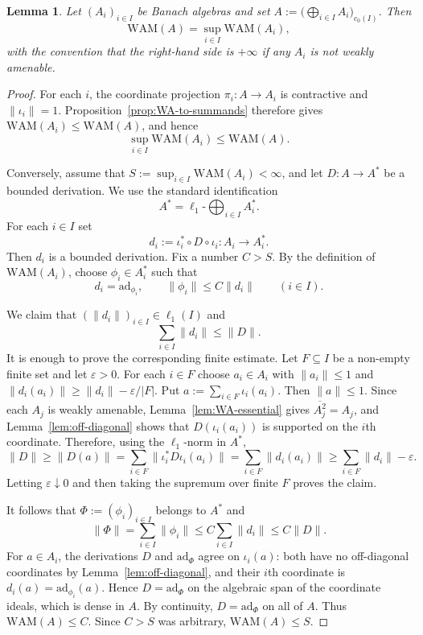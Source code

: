 \documentclass[reqno]{amsart}
\theoremstyle{plain}
\newtheorem{lemma}[theorem]{Lemma}
\theoremstyle{definition}
\theoremstyle{remark}
\renewcommand{\le}{\leqslant}
\renewcommand{\ge}{\geqslant}
\newcommand{\ad}{\mathrm{ad}}
\newcommand{\WAM}{\mathrm{WAM}}  %
\begin{document}
\begin{lemma}\label{lem:WAM-c0}
Let $(A_i)_{i\in I}$ be Banach algebras and set $A:=\big(\bigoplus_{i\in I}A_i\big)_{c_0(I)}$.
Then
\[
\WAM(A)=\sup_{i\in I}\WAM(A_i),
\]
with the convention that the right-hand side is $+\infty$ if any $A_i$ is not weakly amenable.
\end{lemma}


\begin{proof}
For each $i$, the coordinate projection $\pi_i\colon A\to A_i$ is contractive and
$\|\iota_i\|=1$.  Proposition~\ref{prop:WA-to-summands} therefore gives
$\WAM(A_i)\le \WAM(A)$, and hence
\[
\sup_{i\in I}\WAM(A_i)\le \WAM(A).
\]

Conversely, assume that $S:=\sup_{i\in I}\WAM(A_i)<\infty$, and let
$D\colon A\to A^*$ be a bounded derivation.  We use the standard identification
\[
A^*=\ell_1\text{-}\bigoplus_{i\in I} A_i^* .
\]
For each $i\in I$ set
\[
d_i:=\iota_i^*\circ D\circ \iota_i\colon A_i\to A_i^* .
\]
Then $d_i$ is a bounded derivation.  Fix a number $C>S$.  By the definition of
$\WAM(A_i)$, choose $\phi_i\in A_i^*$ such that
\[
d_i=\ad_{\phi_i},\qquad \|\phi_i\|\le C\|d_i\|\qquad (i\in I).
\]

We claim that $(\|d_i\|)_{i\in I}\in\ell_1(I)$ and
\[
\sum_{i\in I}\|d_i\|\le \|D\| .
\]
It is enough to prove the corresponding finite estimate.  Let $F\subseteq I$ be a non-empty
finite set and let $\varepsilon>0$.  For each $i\in F$ choose $a_i\in A_i$ with $\|a_i\|\le 1$ and
$\|d_i(a_i)\|\ge \|d_i\|-\varepsilon/|F|$.
Put $a:=\sum_{i\in F}\iota_i(a_i)$.  Then $\|a\|\le 1$.  Since each $A_j$ is weakly
amenable, Lemma~\ref{lem:WA-essential} gives $\overline{A_j^2}=A_j$, and
Lemma~\ref{lem:off-diagonal} shows that $D(\iota_i(a_i))$ is supported on the $i$th
coordinate.  Therefore, using the $\ell_1$-norm in $A^*$,
\[
\|D\|\ge \|D(a)\|=
\sum_{i\in F}\|\iota_i^*D\iota_i(a_i)\|
=\sum_{i\in F}\|d_i(a_i)\|
\ge \sum_{i\in F}\|d_i\|-\varepsilon.
\]
Letting $\varepsilon\downarrow0$ and then taking the supremum over finite $F$ proves the claim.

It follows that $\Phi:=(\phi_i)_{i\in I}$ belongs to $A^*$ and
\[
\|\Phi\|=\sum_{i\in I}\|\phi_i\|\le C\sum_{i\in I}\|d_i\|\le C\|D\|.
\]
For $a\in A_i$, the derivations $D$ and $\ad_\Phi$ agree on $\iota_i(a)$: both have no
off-diagonal coordinates by Lemma~\ref{lem:off-diagonal}, and their $i$th coordinate is
$d_i(a)=\ad_{\phi_i}(a)$.  Hence $D=\ad_\Phi$ on the algebraic span of the coordinate
ideals, which is dense in $A$.  By continuity, $D=\ad_\Phi$ on all of $A$.
Thus $\WAM(A)\le C$.  Since $C>S$ was arbitrary, $\WAM(A)\le S$.
\end{proof}
\end{document}
